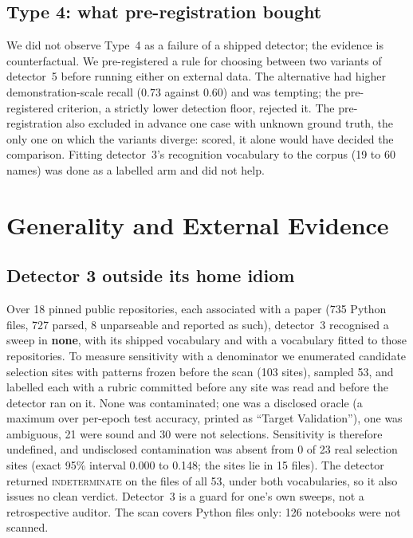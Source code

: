 \documentclass[pmlr,twocolumn,10pt]{jmlr}
\begin{document}
\subsection{Type 4: what pre-registration bought}

We did not observe Type~4 as a failure of a shipped detector; the evidence is
counterfactual. We pre-registered a rule for choosing between two variants of
detector~5 before running either on external data. The alternative had higher
demonstration-scale recall ($0.73$ against $0.60$) and was tempting; the
pre-registered criterion, a strictly lower detection floor, rejected it. The
pre-registration also excluded in advance one case with unknown ground truth,
the only one on which the variants diverge: scored, it alone would have decided
the comparison. Fitting detector~3's recognition vocabulary to the corpus (19 to
60 names) was done as a labelled arm and did not help.

\section{Generality and External Evidence}
\label{sec:generalize}

\subsection{Detector 3 outside its home idiom}

Over 18 pinned public repositories, each associated with a paper (735 Python
files, 727 parsed, 8 unparseable and reported as such), detector~3 recognised a
sweep in \textbf{none}, with its shipped vocabulary and with a vocabulary fitted
to those repositories. To measure sensitivity with a denominator we enumerated
candidate selection sites with patterns frozen before the scan (103 sites),
sampled 53, and labelled each with a rubric committed before any site was read
and before the detector ran on it. None was contaminated; one was a disclosed
oracle (a maximum over per-epoch test accuracy, printed as ``Target
Validation''), one was ambiguous, 21 were sound and 30 were not selections.
Sensitivity is therefore undefined, and undisclosed contamination was absent
from 0 of 23 real selection sites (exact 95\% interval 0.000 to 0.148; the sites
lie in 15 files). The detector returned \textsc{indeterminate} on the files of
all 53, under both vocabularies, so it also issues no clean verdict. Detector~3
is a guard for one's own sweeps, not a retrospective auditor. The scan covers
Python files only: 126 notebooks were not scanned.
\end{document}

